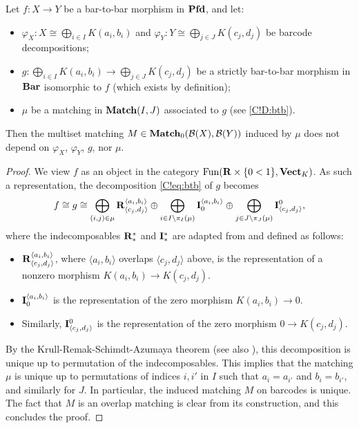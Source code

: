 \begin{proposition}
\label{C!P:unique-induced-matching}
  Let $f \colon X \to Y$ be a bar-to-bar morphism in $\Pfd$, and let:
  \begin{itemize}
    \item $\varphi_X \colon X \cong \bigoplus_{i \in I} K(a_i, b_i)$ and $\varphi_Y \colon Y \cong \bigoplus_{j \in J} K(c_j, d_j)$ be barcode decompositions;
    \item $g \colon \bigoplus_{i \in I} K(a_i, b_i) \to \bigoplus_{j \in J} K(c_j, d_j)$ be a strictly bar-to-bar morphism in $\Bar$ isomorphic to $f$ (which exists by definition);
    \item $\mu$ be a matching in $\Match(I, J)$ associated to $g$ (see \cref{C!D:btb}).
  \end{itemize}
  Then the multiset matching $M \in \Match_0(\cc{B}(X), \cc{B}(Y))$ induced by $\mu$ does not depend on $\varphi_X$, $\varphi_Y$, $g$, nor $\mu$.
\end{proposition}

\begin{proof}
  We view $f$ as an object in the category $\Fun(\R \times \{0 < 1\}, \Vect_K)$. As such a representation, the decomposition \eqref{C!eq:btb} of $g$ becomes
  \[
    f \cong g \cong \bigoplus_{(i, j) \in \mu} \bf{R}^{\langle a_i, b_i \rangle}_{\langle c_j, d_j \rangle} \oplus \bigoplus_{i \in I \setminus \pi_I(\mu)} \bf{I}^{\langle a_i, b_i \rangle}_0 \oplus \bigoplus_{j \in J \setminus \pi_J(\mu)} \bf{I}^0_{\langle c_j, d_j \rangle},
  \]
  where the indecomposables $\bf{R}^*_*$ and $\bf{I}^*_*$ are adapted from \cite[Definition~5.2]{JNT2023} and defined as follows:
  \begin{itemize}
    \item $\bf{R}^{\langle a_i, b_i \rangle}_{\langle c_j, d_j \rangle}$, where $\langle a_i, b_i \rangle$ overlaps $\langle c_j, d_j \rangle$ above, is the representation of a nonzero morphism $K(a_i, b_i) \to K(c_j, d_j)$.
    \item $\bf{I}^{\langle a_i, b_i \rangle}_0$ is the representation of the zero morphism $K(a_i, b_i) \to 0$.
    \item Similarly, $\bf{I}^0_{\langle c_j, d_j \rangle}$ is the representation of the zero morphism $0 \to K(c_j, d_j)$.
  \end{itemize}
  By the Krull-Remak-Schimdt-Azumaya theorem \cite{Goro1950} (see also \cite{BotnanCrawleyBoevey2020}), this decomposition is unique up to permutation of the indecomposables. This implies that the matching $\mu$ is unique up to permutations of indices $i, i'$ in $I$ such that $a_i = a_{i'}$ and $b_i = b_{i'}$, and similarly for $J$. In particular, the induced matching $M$ on barcodes is unique. The fact that $M$ is an overlap matching is clear from its construction, and this concludes the proof.
\end{proof}

